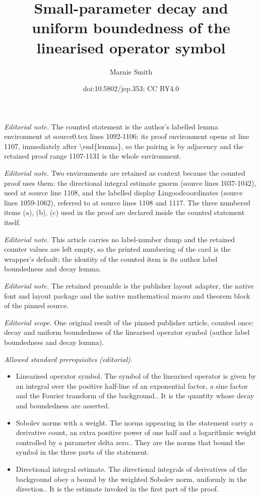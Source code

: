 \documentclass[10pt,a4paper]{article}
\title{Small-parameter decay and uniform boundedness of the linearised operator symbol}
\author{Marnie Smith}
\date{doi:10.5802/jep.353; CC BY4.0}
\theoremstyle{plain}
\theoremstyle{remark}
\begin{document}
\maketitle
\noindent\textit{Editorial note.} The counted statement is the author's labelled lemma environment at source0.tex lines 1092-1106; its proof environment opens at line 1107, immediately after \textbackslash{}end\{lemma\}, so the pairing is by adjacency and the retained proof range 1107-1131 is the whole environment.\par\medskip
\noindent\textit{Editorial note.} Two environments are retained as context because the counted proof uses them: the directional integral estimate gnorm (source lines 1037-1042), used at source line 1108, and the labelled display Lingoodcoordinates (source lines 1059-1062), referred to at source lines 1108 and 1117. The three numbered items (a), (b), (c) used in the proof are declared inside the counted statement itself.\par\medskip
\noindent\textit{Editorial note.} This article carries no label-number dump and the retained counter values are left empty, so the printed numbering of the card is the wrapper's default; the identity of the counted item is its author label boundedness and decay lemma.\par\medskip
\noindent\textit{Editorial note.} The retained preamble is the publisher layout adapter, the native font and layout package and the native mathematical macro and theorem block of the pinned source.\par\medskip
\noindent\textit{Editorial scope.} One original result of the pinned publisher article, counted once: decay and uniform boundedness of the linearised operator symbol (author label boundedness and decay lemma).\par\medskip
\noindent\textit{Allowed standard prerequisites (editorial).}\begin{itemize}
\item Linearised operator symbol. The symbol of the linearised operator is given by an integral over the positive half-line of an exponential factor, a sine factor and the Fourier transform of the background.. It is the quantity whose decay and boundedness are asserted.
\item Sobolev norms with a weight. The norms appearing in the statement carry a derivative count, an extra positive power of one half and a logarithmic weight controlled by a parameter delta zero.. They are the norms that bound the symbol in the three parts of the statement.
\item Directional integral estimate. The directional integrals of derivatives of the background obey a bound by the weighted Sobolev norm, uniformly in the direction.. It is the estimate invoked in the first part of the proof.
\end{itemize}\medskip
\end{document}
